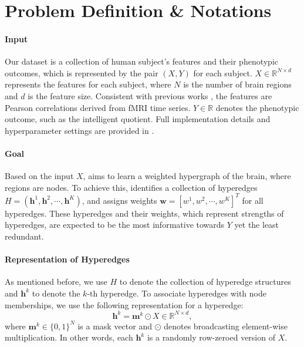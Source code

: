 \section{Problem Definition \& Notations}
\label{sec:hybrid-prelims}
\paragraph{Input} 
 Our dataset is a collection of human subject's features and their phenotypic outcomes, which is represented by the pair $(X, Y)$ for each subject. $X \in \mathbb{R}^{N \times d}$ represents the features for each subject, where $N$ is the number of brain regions and $d$ is the feature size. Consistent with previous works \citep{kan2022brain,li2021braingnn}, the features are Pearson correlations derived from fMRI time series. $Y \in \mathbb{R}$ denotes the phenotypic outcome, such as the intelligent quotient. Full implementation details and hyperparameter settings are provided in \cite{qiu2023learning}.
 

\paragraph{Goal}
Based on the input $X$, \hybrid{} aims to learn a weighted hypergraph of the brain, where regions are nodes. To achieve this, \hybrid{} identifies a collection of hyperedges $H = (\boldsymbol{h}^1, \boldsymbol{h}^2, \cdots, \boldsymbol{h}^K)$, and assigns weights $\boldsymbol{w} = [w^1, w^2, \cdots, w^K]^T$ for all hyperedges. These hyperedges and their weights, which represent strengths of hyperedges, are expected to be the most informative towards $Y$ yet the least redundant. 

\paragraph{Representation of Hyperedges}
As mentioned before, we use $H$ to denote the collection of hyperedge structures and $\boldsymbol{h}^k$ to denote the $k$-th hyperedge. To associate hyperedges with node memberships, we use the following representation for a hyperedge:
\begin{equation}
    \boldsymbol{h}^k = \boldsymbol{m}^k \odot X \in \mathbb{R}^{N\times d},
\end{equation}
where $\boldsymbol{m}^k \in \{0,1\}^N$ is a mask vector and $\odot$ denotes broadcasting element-wise multiplication. In other words, each $\boldsymbol{h}^k$ is a randomly row-zeroed version of $X$.